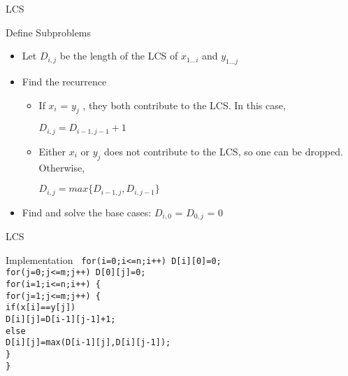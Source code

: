 \documentclass{beamer}
\begin{document}
\begin{frame}[<+->]{LCS}
  \begin{block}{Define Subproblems}
  \begin{itemize}
    \item Let $D_{i,j}$ be the length of the LCS of $x_{1 \dots i}$ and $y_{1 \dots j}$
    \item Find the recurrence\\
    \begin{itemize}
      \item If $x_i$ = $y_j$ , they both contribute to the LCS. In this case,
      \begin{center}$D_{i,j} = D_{i-1,j-1} + 1$\end{center}
      \item Either $x_i$ or $y_j$ does not contribute to the LCS, so one can be dropped. Otherwise, 
      \begin{center}$D_{i,j} = max\{D_{i-1,j},D_{i,j-1}\}$\end{center}
    \end{itemize}
    \item Find and solve the base cases: $D_{i,0}$ = $D_{0,j}$ = 0
  \end{itemize}
  \end{block}
\end{frame}

\begin{frame}[<+->]{LCS}
  \begin{block}{Implementation}
  \tt{
    for(i=0;i<=n;i++) D[i][0]=0;\\
    for(j=0;j<=m;j++) D[0][j]=0;\\
    for(i=1;i<=n;i++) \{\\
      \hspace{2mm} for(j=1;j<=m;j++) \{\\
	\hspace{5mm} if(x[i]==y[j])\\
	  \hspace{8mm} D[i][j]=D[i-1][j-1]+1;\\
	\hspace{5mm} else\\
	   \hspace{8mm} D[i][j]=max(D[i-1][j],D[i][j-1]);\\
	\hspace{2mm} \}\\
      \}
    }
  \end{block}
\end{frame}
\end{document}
